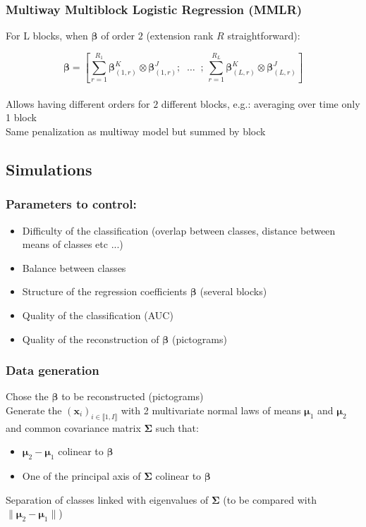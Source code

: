 \documentclass{beamer}
\begin{document}
\begin{frame}
    \frametitle{Multiway Multiblock Logistic Regression (MMLR)}

    For L blocks, when $\bm{\beta}$  of order $2$ (extension rank $R$ straightforward):

    $$    \bm{\beta} = \left[ \sum\limits_{r = 1}^{R_1} \bm{\beta}_{(1,r)}^{K} \otimes \bm{\beta}_{(1,r)}^J;   \; \; \hdots  \; \; ;\, \sum\limits_{r = 1}^{R_L}\bm{\beta}_{(L,r)}^K \otimes \bm{\beta}_{(L,r)}^J \right] $$
    \phantom{a}\\
    Allows having different orders for $2$ different blocks,  e.g.: averaging over time only 1 block\\[10 pt]
    Same penalization as multiway model but summed by block
\end{frame}

\begin{frame}
    \section{Simulations}    
\end{frame}

\begin{frame}
    \frametitle{Parameters to control:}
    \begin{itemize}
        \item Difficulty of the classification (overlap between classes, distance between means of classes etc ...)\\[12 pt]
        \item Balance between classes\\[12 pt]
        \item Structure of the regression coefficients $\bm{\beta}$ (several blocks)\\[12 pt] 
        \item Quality of the classification (AUC)\\[12 pt]
        \item Quality of the reconstruction of $\bm{\beta}$ (pictograms)
    \end{itemize}
\end{frame}

\begin{frame}
    \frametitle{Data generation}
    Chose the $\bm{\beta}$ to be reconstructed (pictograms)\\[10 pt]
    Generate the $(\mathbf{x}_i)_{i \in \llbracket 1, I\rrbracket}$ with 2 multivariate normal laws of means $\bm{\mu}_1$ and $\bm{\mu}_2$ and common covariance matrix $\bm{\Sigma}$ such that:
    \begin{itemize}
        \item $\bm{\mu}_2 - \bm{\mu}_1$ colinear to $\bm{\beta}$\\[10 pt]
        \item One of the principal axis of $\bm{\Sigma}$ colinear to $\bm{\beta}$
    \end{itemize}
    Separation of classes linked with eigenvalues of $\bm{\Sigma}$ (to be compared with $\lVert\bm{\mu}_2 - \bm{\mu}_1 \rVert$)
\end{frame}
\end{document}
